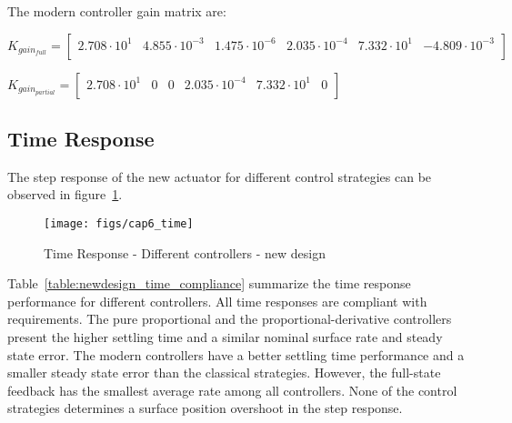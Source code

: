 The modern controller gain matrix are:
\begin{center}
$K_{gain_{full}}= \begin{bmatrix}
2.708\cdot10^1 & 4.855\cdot10^{-3} & 1.475\cdot10^{-6} & 2.035\cdot10^{-4} & 7.332\cdot10^1 & -4.809\cdot10^{-3}\\
\end{bmatrix}$
\end{center}
\begin{center}
$K_{gain_{partial}}= \begin{bmatrix}
2.708\cdot10^1 & 0 & 0 & 2.035\cdot10^{-4} & 7.332\cdot10^1 & 0\\
\end{bmatrix}$
\end{center}


\subsection{Time Response}

The step response of the new actuator for different control strategies can be observed in figure~\ref{fig:time_newdesign}.

\begin{figure}[H]
\centering
\texttt{[image: figs/cap6\_time]}
\caption{Time Response - Different controllers - new design}
\label{fig:time_newdesign}
\end{figure}

Table~\ref{table:newdesign_time_compliance} summarize the time response performance for different controllers. All time responses are compliant with requirements. The pure proportional and the proportional-derivative controllers present the higher settling time and a similar nominal surface rate and steady state error. The modern controllers have a better settling time performance and a smaller steady state error than the classical strategies. However, the full-state feedback has the smallest average rate among all controllers. None of the control strategies determines a surface position overshoot in the step response.

